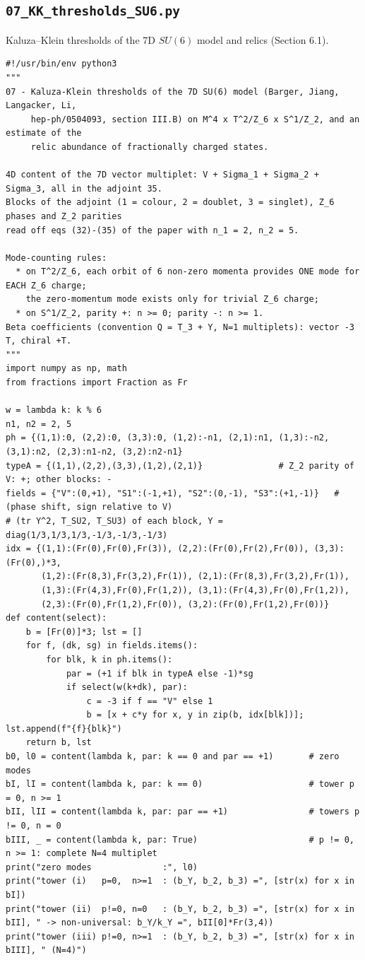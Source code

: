 \documentclass[11pt,a4paper]{article}
\begin{document}
\subsection{\texttt{07\_KK\_thresholds\_SU6.py}}
Kaluza--Klein thresholds of the 7D $SU(6)$ model and relics (Section 6.1).
\begin{lstlisting}
#!/usr/bin/env python3
"""
07 - Kaluza-Klein thresholds of the 7D SU(6) model (Barger, Jiang, Langacker, Li,
     hep-ph/0504093, section III.B) on M^4 x T^2/Z_6 x S^1/Z_2, and an estimate of the
     relic abundance of fractionally charged states.

4D content of the 7D vector multiplet: V + Sigma_1 + Sigma_2 + Sigma_3, all in the adjoint 35.
Blocks of the adjoint (1 = colour, 2 = doublet, 3 = singlet), Z_6 phases and Z_2 parities
read off eqs (32)-(35) of the paper with n_1 = 2, n_2 = 5.

Mode-counting rules:
  * on T^2/Z_6, each orbit of 6 non-zero momenta provides ONE mode for EACH Z_6 charge;
    the zero-momentum mode exists only for trivial Z_6 charge;
  * on S^1/Z_2, parity +: n >= 0; parity -: n >= 1.
Beta coefficients (convention Q = T_3 + Y, N=1 multiplets): vector -3 T, chiral +T.
"""
import numpy as np, math
from fractions import Fraction as Fr

w = lambda k: k % 6
n1, n2 = 2, 5
ph = {(1,1):0, (2,2):0, (3,3):0, (1,2):-n1, (2,1):n1, (1,3):-n2, (3,1):n2, (2,3):n1-n2, (3,2):n2-n1}
typeA = {(1,1),(2,2),(3,3),(1,2),(2,1)}               # Z_2 parity of V: +; other blocks: -
fields = {"V":(0,+1), "S1":(-1,+1), "S2":(0,-1), "S3":(+1,-1)}   # (phase shift, sign relative to V)
# (tr Y^2, T_SU2, T_SU3) of each block, Y = diag(1/3,1/3,1/3,-1/3,-1/3,-1/3)
idx = {(1,1):(Fr(0),Fr(0),Fr(3)), (2,2):(Fr(0),Fr(2),Fr(0)), (3,3):(Fr(0),)*3,
       (1,2):(Fr(8,3),Fr(3,2),Fr(1)), (2,1):(Fr(8,3),Fr(3,2),Fr(1)),
       (1,3):(Fr(4,3),Fr(0),Fr(1,2)), (3,1):(Fr(4,3),Fr(0),Fr(1,2)),
       (2,3):(Fr(0),Fr(1,2),Fr(0)), (3,2):(Fr(0),Fr(1,2),Fr(0))}
def content(select):
    b = [Fr(0)]*3; lst = []
    for f, (dk, sg) in fields.items():
        for blk, k in ph.items():
            par = (+1 if blk in typeA else -1)*sg
            if select(w(k+dk), par):
                c = -3 if f == "V" else 1
                b = [x + c*y for x, y in zip(b, idx[blk])]; lst.append(f"{f}{blk}")
    return b, lst
b0, l0 = content(lambda k, par: k == 0 and par == +1)       # zero modes
bI, lI = content(lambda k, par: k == 0)                     # tower p = 0, n >= 1
bII, lII = content(lambda k, par: par == +1)                # towers p != 0, n = 0
bIII, _ = content(lambda k, par: True)                      # p != 0, n >= 1: complete N=4 multiplet
print("zero modes              :", l0)
print("tower (i)   p=0,  n>=1  : (b_Y, b_2, b_3) =", [str(x) for x in bI])
print("tower (ii)  p!=0, n=0   : (b_Y, b_2, b_3) =", [str(x) for x in bII], " -> non-universal: b_Y/k_Y =", bII[0]*Fr(3,4))
print("tower (iii) p!=0, n>=1  : (b_Y, b_2, b_3) =", [str(x) for x in bIII], " (N=4)")


\end{lstlisting}
\end{document}
